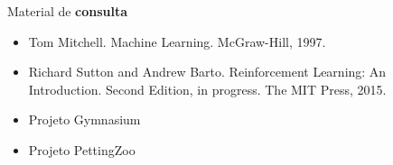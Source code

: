 \documentclass{beamer}
\begin{document}
%	
%	
%	
%
%
%
%
%
%
%
%

\begin{frame}{Material de \textbf{consulta}}
\begin{itemize}
  \item Tom Mitchell. Machine Learning. McGraw-Hill, 1997.
  \item Richard Sutton and Andrew Barto. Reinforcement Learning: An Introduction. Second Edition, in progress. The MIT Press, 2015.
  \item Projeto Gymnasium \href{https://gymnasium.farama.org/}{}
  \item Projeto PettingZoo \href{https://pettingzoo.farama.org/}{}
\end{itemize}
\end{frame}
\end{document}
